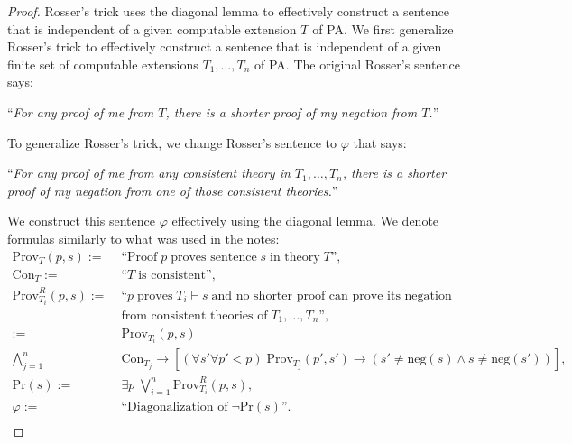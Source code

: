 \documentclass{article}
\begin{document}
\begin{enumerate}[label={\bf Q\arabic*:}]
    \begin{proof}
      Rosser's trick uses the diagonal lemma to effectively construct a
      sentence that is independent of a given computable extension $T$ of
      PA. We first generalize Rosser's trick to effectively construct a
      sentence that is independent of a given finite set of computable
      extensions $T_1,\ldots,T_n$ of PA. The original Rosser's sentence
      says:
      \begin{center}
        ``\textit{For any proof of me from $T$, there is a shorter proof of my
        negation from $T$.}''
      \end{center}

      To generalize Rosser's trick, we change Rosser's sentence to
      $\varphi$ that says:
      \begin{center}
        ``\textit{For any proof of me from any consistent theory in
        $T_1,\ldots,T_n$, there is a shorter proof of my
        negation from one of those consistent theories.}''
      \end{center}

      We construct this sentence $\varphi$ effectively using the diagonal
      lemma. We denote formulas similarly to what was used in the notes:
      \begin{align*}
        \text{Prov}_T(p,s) :=&\;\text{``Proof}\; p\; \text{proves
          sentence}\; s\; \text{in theory}\; T\text{''},\\
        \text{Con}_T :=&\;\text{``}T\; \text{is consistent''},\\
        \text{Prov}_{T_i}^R(p,s) :=&\;\text{``}p\; \text{proves}\;
          T_i\vdash s\; \text{and no shorter proof can prove its
          negation}\\
          &\;\text{from consistent theories of}\; T_1,\ldots,T_n
          \text{''},\\ :=&\;\text{Prov}_{T_i}(p,s)\\
          \bigwedge_{j=1}^n&\; \text{Con}_{T_j} \rightarrow [(\forall
          s'\forall p'<p)\; \text{Prov}_{T_j}(p',s') \rightarrow
          (s'\neq\text{neg}(s) \wedge s\neq\text{neg}(s'))], \\
        \text{Pr}(s) :=&\;\exists p\; \bigvee_{i=1}^n
          \text{Prov}_{T_i}^R(p,s),\\
        \varphi :=&\;\text{``Diagonalization of}\; \neg\text{Pr}(s)
          \text{''}.\\
      \end{align*}


\end{proof}
\end{enumerate}
\end{document}
